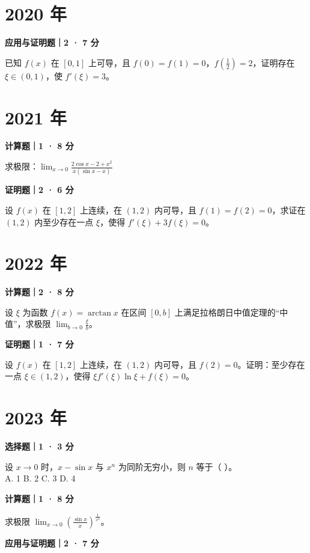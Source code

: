 

\section*{2020 年}


\textbf{应用与证明题｜2 · 7 分}

已知 $f(x)$ 在 $[0,1]$ 上可导，且 $f(0) = f(1) = 0$，$f \left(\frac{1}{2}\right) = 2$，证明存在 $\xi \in (0,1)$，使 $f'(\xi) = 3$。


\section*{2021 年}


\textbf{计算题｜1 · 8 分}

求极限：$\lim_{x \to 0} \frac{2\cos x - 2 + x^2}{x(\sin x - x)}$


\textbf{证明题｜2 · 6 分}

设 $f(x)$ 在 $[1, 2]$ 上连续，在 $(1, 2)$ 内可导，且 $f(1) = f(2) = 0$，求证在 $(1, 2)$ 内至少存在一点 $\xi$，使得 $f'(\xi) + 3f(\xi) = 0$。


\section*{2022 年}


\textbf{计算题｜2 · 8 分}

设 $\xi$ 为函数 $f(x) = \arctan x$ 在区间 $[0, b]$ 上满足拉格朗日中值定理的“中值”，求极限 $\lim_{b \to 0} \frac{\xi}{b}$。


\textbf{证明题｜1 · 7 分}

设 $f(x)$ 在 $[1, 2]$ 上连续，在 $(1, 2)$ 内可导，且 $f(2) = 0$。证明：至少存在一点 $\xi \in (1, 2)$，使得 $\xi f'(\xi)\ln\xi + f(\xi) = 0$。


\section*{2023 年}


\textbf{选择题｜1 · 3 分}

设 $x \to 0$ 时，$x - \sin x$ 与 $x^n$ 为同阶无穷小，则 $n$ 等于（ \quad ）。\\
A. 1 \quad B. 2 \quad C. 3 \quad D. 4


\textbf{计算题｜1 · 8 分}

求极限 $\lim_{x \to 0} \left( \frac{\sin x}{x} \right)^{\frac{1}{x^2}}$。


\textbf{应用与证明题｜2 · 7 分}

